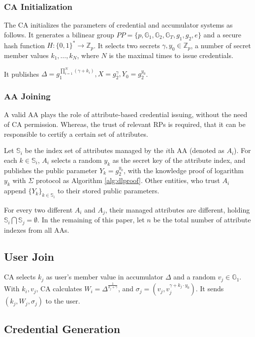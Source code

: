 \documentclass[journal]{IEEEtran}
\begin{document}
	\subsubsection{CA Initialization}
	The CA initializes the parameters of credential and accumulator systems as follows. It generates a bilinear group $PP=\{p, \mathbb{G}_1, \mathbb{G}_2, \mathbb{G}_T, g_1, g_2, e\}$ and a secure hash function $H:\{0,1\}^*\rightarrow \mathbb{Z}_p$. It selects two secrets $\gamma, y_0\in \mathbb{Z}_p$, a number of secret member values $k_1, \dots, k_N$, where $N$ is the maximal times to issue credentials.
	
	It publishes $\Delta = g_1^{\prod_{i=1}^{N}(\gamma+k_i)}, X= g_2^\gamma, Y_0= g_2^{y_0}$.
	\subsubsection{AA Joining}
	A valid AA plays the role of attribute-based credential issuing, without the need of CA permission. Whereas, the trust of relevant RPs is required, that it can be responsible to certify a certain set of attributes.
	
	Let $\mathbb{S}_i$ be the index set of attributes managed by the $i$th AA (denoted as $A_i$). For each $k\in \mathbb{S}_i$, $A_i$ selects a random $y_k$ as the secret key of the attribute index, and publishes the public parameter $Y_k = g_2^{y_k}$, with the knowledge proof of logarithm $y_k$ with $\Sigma$ protocol as Algorithm \ref{alg:dlproof}. 
	Other entities, who trust $A_i$ append $\{Y_k\}_{k\in \mathbb{S}_i}$ to their stored public parameters.
	
	For every two different $A_i$ and $A_j$, their managed attributes are different, holding $\mathbb{S}_i \bigcap \mathbb{S}_j = \emptyset$. In the remaining of this paper, let $n$ be the total number of attribute indexes from all AAs.
	\subsection{User Join}
	CA selects $k_j$ as user's member value in accumulator $\Delta$ and a random $v_j \in \mathbb{G}_1$. With $k_i, v_j$, CA calculates $W_i = \Delta^{\frac{1}{k_j + \gamma}}$, and $\sigma_j = (v_j, v_j^{\gamma+ k_j\cdot y_0})$. It sends $(k_j, W_j, \sigma_j)$ to the user. 
	
	\subsection{Credential Generation}
	
\end{document}
